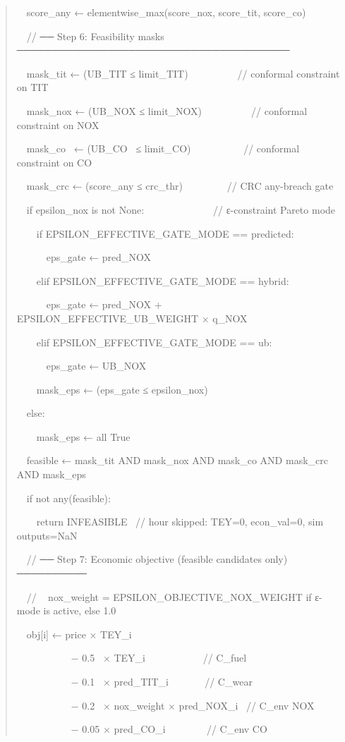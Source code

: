\documentclass[11pt]{article}
\begin{document}
\begin{quote}
~~score\_any ← elementwise\_max(score\_nox, score\_tit, score\_co)

~~// ── Step 6: Feasibility masks
───────────────────────────────────────

~~mask\_tit ← (UB\_TIT ≤ limit\_TIT)~ ~ ~ ~ ~ ~ // conformal constraint
on TIT

~~mask\_nox ← (UB\_NOX ≤ limit\_NOX)~ ~ ~ ~ ~ ~ // conformal constraint
on NOX

~~mask\_co~ ← (UB\_CO~ ≤ limit\_CO) ~ ~ ~ ~ ~ ~ // conformal constraint
on CO

~~mask\_crc ← (score\_any ≤ crc\_thr) ~ ~ ~ ~ ~ // CRC any-breach gate

~~if epsilon\_nox is not None: ~ ~ ~ ~ ~ ~ ~ ~ // ε-constraint Pareto
mode

~~~~if EPSILON\_EFFECTIVE\_GATE\_MODE ==
\textquotesingle predicted\textquotesingle:

~~~~~~eps\_gate ← pred\_NOX

~~~~elif EPSILON\_EFFECTIVE\_GATE\_MODE ==
\textquotesingle hybrid\textquotesingle:

~~~~~~eps\_gate ← pred\_NOX + EPSILON\_EFFECTIVE\_UB\_WEIGHT × q\_NOX

~~~~elif EPSILON\_EFFECTIVE\_GATE\_MODE ==
\textquotesingle ub\textquotesingle:

~~~~~~eps\_gate ← UB\_NOX

~~~~mask\_eps ← (eps\_gate ≤ epsilon\_nox)

~~else:

~~~~mask\_eps ← all True

~~feasible ← mask\_tit AND mask\_nox AND mask\_co AND mask\_crc AND
mask\_eps

~~if not any(feasible):

~~~~return INFEASIBLE~ // hour skipped: TEY=0, econ\_val=0, sim
outputs=NaN

~~// ── Step 7: Economic objective (feasible candidates only) ──────────

~~// ~ nox\_weight = EPSILON\_OBJECTIVE\_NOX\_WEIGHT if ε-mode is
active, else 1.0

~~obj{[}i{]} ← price × TEY\_i

~~~~~~~~~~~− 0.5~ × TEY\_i~ ~ ~ ~ ~ ~ ~ // C\_fuel

~~~~~~~~~~~− 0.1~ × pred\_TIT\_i ~ ~ ~ ~ // C\_wear

~~~~~~~~~~~− 0.2~ × nox\_weight × pred\_NOX\_i~ // C\_env NOX

~~~~~~~~~~~− 0.05 × pred\_CO\_i~ ~ ~ ~ ~ // C\_env CO


\end{quote}
\end{document}
